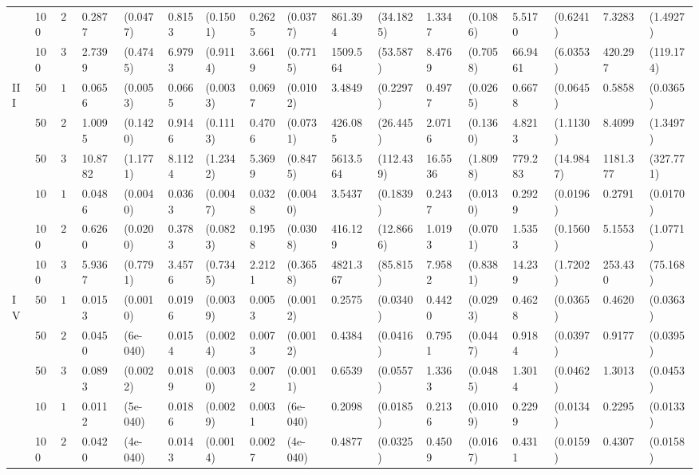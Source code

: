 \begin{table}[H]
\begin{footnotesize}
\begin{tabular}{lllllllllllllllll}
    &  100 & $20$ & 0.2877 & (0.0477) & 0.8153 & (0.1501) & 0.2625 & (0.0377) & 861.394 & (34.1825) & 1.3347 & (0.1086) & 5.5170 & (0.6241) & 7.3283 & (1.4927) \\ 
    & 100  & $30$ & 2.7399 & (0.4745) & 6.9793 & (0.9114) & 3.6619 & (0.7715) & 1509.564 & (53.587) & 8.4769 & (0.7058) & 66.9461 & (6.0353) & 420.297 & (119.174) \\ 
   III & $50$ & $10$ & 0.0656 & (0.0053) & 0.0665 & (0.0033) & 0.0697 & (0.0102) & 3.4849 & (0.2297) & 0.4977 & (0.0265) & 0.6678 & (0.0645) & 0.5858 & (0.0365) \\ 
    &  50 & $20$ & 1.0095 & (0.1420) & 0.9146 & (0.1113) & 0.4706 & (0.0731) & 426.085 & (26.445) & 2.0716 & (0.1360) & 4.8213 & (1.1130) & 8.4099 & (1.3497) \\ 
    & 50  & $30$ & 10.8782 & (1.1771) & 8.1124 & (1.2342) & 5.3699 & (0.8475) & 5613.564 & (112.439) & 16.5536 & (1.8098) & 779.283 & (14.9847) & 1181.377 & (327.771) \\ 
    & $100$ & $10$ & 0.0486 & (0.0040) & 0.0363 & (0.0047) & 0.0328 & (0.0040) & 3.5437 & (0.1839) & 0.2437 & (0.0130) & 0.2929 & (0.0196) & 0.2791 & (0.0170) \\ 
    & 100  & $20$ & 0.6260 & (0.0200) & 0.3783 & (0.0823) & 0.1958 & (0.0308) & 416.129 & (12.8666) & 1.0193 & (0.0701) & 1.5353 & (0.1560) & 5.1553 & (1.0771) \\ 
    &  100 & $30$ & 5.9367 & (0.7791) & 3.4576 & (0.7345) & 2.2121 & (0.3658) & 4821.367 & (85.815) & 7.9582 & (0.8381) & 14.239 & (1.7202) & 253.430 & (75.168) \\ 
  IV & $50$ & $10$ & 0.0153 & (0.0010) & 0.0196 & (0.0039) & 0.0053 & (0.0012) & 0.2575 & (0.0340) & 0.4420 & (0.0293) & 0.4628 & (0.0365) & 0.4620 & (0.0363) \\ 
    & 50  & $20$ & 0.0450 & (6e-040) & 0.0154 & (0.0024) & 0.0073 & (0.0012) & 0.4384 & (0.0416) & 0.7951 & (0.0447) & 0.9184 & (0.0397) & 0.9177 & (0.0395) \\ 
    & 50  & $30$ & 0.0893 & (0.0022) & 0.0189 & (0.0030) & 0.0072 & (0.0011) & 0.6539 & (0.0557) & 1.3363 & (0.0485) & 1.3014 & (0.0462) & 1.3013 & (0.0453) \\ 
    & $100$ & $10$ & 0.0112 & (5e-040) & 0.0186 & (0.0029) & 0.0031 & (6e-040) & 0.2098 & (0.0185) & 0.2136 & (0.0109) & 0.2299 & (0.0134) & 0.2295 & (0.0133) \\ 
    & 100  & $20$ & 0.0420 & (4e-040) & 0.0143 & (0.0014) & 0.0027 & (4e-040) & 0.4877 & (0.0325) & 0.4509 & (0.0167) & 0.4311 & (0.0159) & 0.4307 & (0.0158) \\ 

\end{tabular}
\end{footnotesize}
\end{table}
